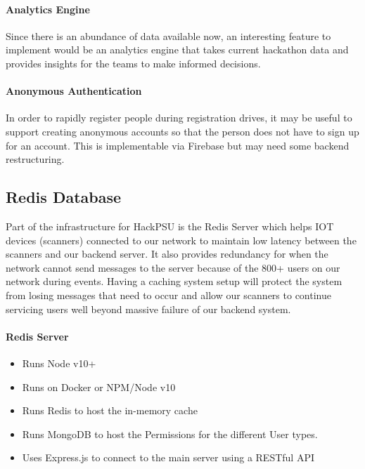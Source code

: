 \documentclass[twoside, 12pt]{article}
\newenvironment{tightitemize} %
{\begin{itemize}\itemsep1pt \parskip0pt \parsep0pt}
{\end{itemize}\vspace{-\topsep}}
\begin{document}
\paragraph{Analytics Engine}
\par Since there is an abundance of data available now, an interesting feature to implement would be an analytics engine that takes current hackathon data and provides insights for the teams to make informed decisions.
\paragraph{Anonymous Authentication}
\par In order to rapidly register people during registration drives, it may be useful to support creating anonymous accounts so that the person does not have to sign up for an account. This is implementable via Firebase but may need some backend restructuring.

\newpage
\subsection{Redis Database} \label{section:redis}
\par Part of the infrastructure for HackPSU is the Redis Server which helps IOT devices  (scanners) connected to our network to maintain low latency between the scanners and our backend server. It also provides redundancy for when the network cannot send messages to the server because of the 800+ users on our network during events. Having a caching system setup will protect the system from losing messages that need to occur and allow our scanners to continue servicing users well beyond massive failure of our backend system.
\paragraph{Redis Server}
\begin{tightitemize}
    \item Runs Node v10+
    \item Runs on Docker or NPM/Node v10
    \item Runs Redis to host the in-memory cache
    \item Runs MongoDB to host the Permissions for the different User types.
    \item Uses Express.js to connect to the main server using a RESTful API
\end{tightitemize}
\end{document}
